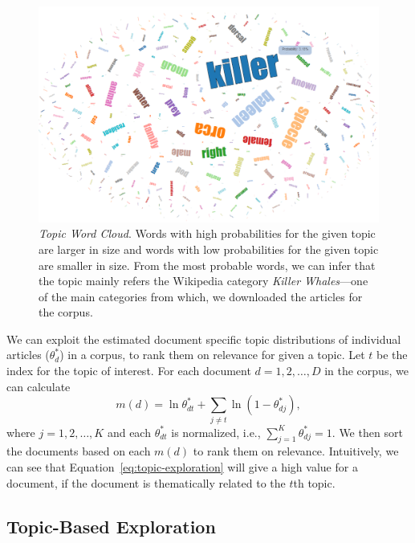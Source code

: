 \begin{figure}[htb]\centering 
\includegraphics[width=.9\textwidth]{images/topic_visualization.png}
\caption{\textsl{Topic Word Cloud}. Words with high probabilities for the 
given topic are larger in size and words with low probabilities for 
the given topic are smaller in size. From the most probable words, 
we can infer that the topic mainly refers the Wikipedia category 
\textit{Killer Whales}---one of the main categories from which, we 
downloaded the articles for the corpus.}
\label{fig:topic-word-cloud}
\end{figure}

We can exploit the estimated document specific topic distributions 
 of individual articles ($\theta_d^{*}$) in a corpus, to rank them on 
relevance for given a topic. Let $t$ be the index for the topic of 
interest. For each document $d = 1, 2, \ldots, D$ in the corpus, we 
can calculate~\cite{George2012}
\begin{equation}
m(d) = \ln \theta^*_{dt} + \sum_{j \neq t}{\ln (1 - \theta^*_{dj})},
\label{eq:topic-exploration}
\end{equation} 
where $j = 1, 2, \ldots, K$ and each $\theta^*_{dt}$ is 
normalized, i.e., $\sum_{j=1}^{K}{\theta^*_{dj}} = 1$. We then sort 
the documents based on each $m(d)$ to rank them on relevance. 
Intuitively, we can see that Equation~\ref{eq:topic-exploration} 
will give a high value for a document, if the document is 
thematically related to the $t$th topic. 

\subsection{Topic-Based Exploration}

